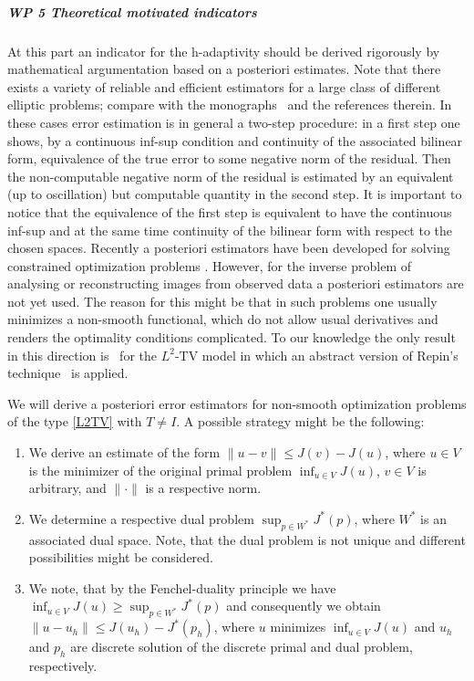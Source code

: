 \documentclass[enabledeprecatedfontcommands,cleardoublepage=empty,headsepline,twoside,11pt,DIV=15,BCOR=12mm,final]{scrartcl}
\begin{document}
 

 
%
% 
 
 
 \subparagraph{WP 5 Theoretical motivated indicators}
 
  At this part an indicator for the h-adaptivity should be derived rigorously by mathematical argumentation based on a posteriori estimates. Note that there exists a variety of reliable and efficient estimators for a large class of different elliptic problems; compare with the monographs~\cite{AinOde,Ciarlet:02,Verfurth:96} and the references therein. In these cases error estimation is in general a two-step procedure: in a first step one shows, by a continuous inf-sup condition and continuity of the associated bilinear form, equivalence of the true error to some negative norm of the residual. Then the non-computable negative norm of the residual is estimated by an equivalent (up to oscillation) but computable quantity in the second step. It is important to notice that the equivalence of the first step is equivalent to have the continuous inf-sup and at the same time continuity of the bilinear form with respect to the chosen spaces. Recently a posteriori estimators have been developed for solving constrained optimization problems \cite{KoRoSi:14}. However, for the inverse problem of analysing or reconstructing images from observed data a posteriori estimators are not yet used. The reason for this might be that in such problems one usually minimizes a non-smooth functional, which do not allow usual derivatives and renders the optimality conditions complicated. To our knowledge the only result in this direction is~\cite{Bar2015} for the $L^2$-TV model in which an abstract version of Repin's technique~\cite{Repin} is applied.
 
 We will derive a posteriori error estimators for non-smooth optimization problems of the type \eqref{L2TV} with $T\not= I$. A possible strategy might be the following: 
\begin{enumerate}[1.]
\item We derive an estimate of the form $\|u -v \| \leq J(v) - J(u)$, where $u\in V$ is the minimizer of the original primal problem $\inf_{u\in V} J(u)$, $v\in V$ is arbitrary, and $\|\cdot\|$ is a respective norm.
\item We determine a respective dual problem $\sup_{p\in W^*} J^*(p)$, where $W^*$ is an associated dual space. Note, that the dual problem is not unique and different possibilities might be considered. %
\item We note, that by the Fenchel-duality principle we have $\inf_{u\in V} J(u)\geq \sup_{p\in W^*} J^*(p)$ and consequently we obtain $\|u -u_h \| \leq J(u_h) - J^*(p_h)$, where $u$ minimizes  $\inf_{u\in V} J(u)$ and $u_h$ and $p_h$ are discrete solution of the discrete primal and dual problem, respectively. 
\end{enumerate} 
\end{document}

